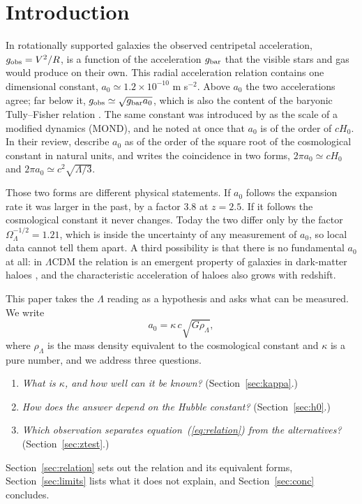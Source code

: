 \documentclass[fleqn,usenatbib]{mnras}
\begin{document}
\section{Introduction}
\label{sec:intro}
In rotationally supported galaxies the observed centripetal acceleration, $g_{\rm obs}=V^2/R$, is a function of the acceleration $g_{\rm bar}$ that the visible stars and gas would produce on their own. This radial acceleration relation \citep{McGaugh2016,Lelli2017} contains one dimensional constant, $a_0\simeq1.2\times10^{-10}$ m s$^{-2}$. Above $a_0$ the two accelerations agree; far below it, $g_{\rm obs}\simeq\sqrt{g_{\rm bar}a_0}$, which is also the content of the baryonic Tully--Fisher relation \citep{McGaugh2012,Lelli2019}. The same constant was introduced by \citet{Milgrom1983} as the scale of a modified dynamics (MOND), and he noted at once that $a_0$ is of the order of $cH_0$. In their review, \citet{FamaeyMcGaugh2012} describe $a_0$ as of the order of the square root of the cosmological constant in natural units, and \citet{Milgrom2020} writes the coincidence in two forms, $2\pi a_0\simeq cH_0$ and $2\pi a_0\simeq c^2\sqrt{\Lambda/3}$.

Those two forms are different physical statements. If $a_0$ follows the expansion rate it was larger in the past, by a factor $3.8$ at $z=2.5$. If it follows the cosmological constant it never changes. Today the two differ only by the factor $\Omega_\Lambda^{-1/2}=1.21$, which is inside the uncertainty of any measurement of $a_0$, so local data cannot tell them apart. A third possibility is that there is no fundamental $a_0$ at all: in $\Lambda$CDM the relation is an emergent property of galaxies in dark-matter haloes \citep{Navarro2017,Ludlow2017,KellerWadsley2017}, and the characteristic acceleration of haloes also grows with redshift.

This paper takes the $\Lambda$ reading as a hypothesis and asks what can be measured. We write
\begin{equation}
a_0=\kappa\,c\sqrt{G\rho_\Lambda},
\label{eq:relation}
\end{equation}
where $\rho_\Lambda$ is the mass density equivalent to the cosmological constant and $\kappa$ is a pure number, and we address three questions.
\begin{enumerate}
\item \emph{What is $\kappa$, and how well can it be known?} (Section~\ref{sec:kappa}.)
\item \emph{How does the answer depend on the Hubble constant?} (Section~\ref{sec:h0}.)
\item \emph{Which observation separates equation~(\ref{eq:relation}) from the alternatives?} (Section~\ref{sec:ztest}.)
\end{enumerate}
Section~\ref{sec:relation} sets out the relation and its equivalent forms, Section~\ref{sec:limits} lists what it does not explain, and Section~\ref{sec:conc} concludes.
\end{document}
